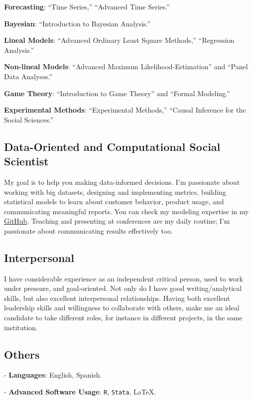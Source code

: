\documentclass[letterpaper]{article}
\renewenvironment{itemize}{
  \begin{list}{}{
    \setlength{\leftmargin}{1.5em}
  }
}{
  \end{list}
}
\begin{document}
\begin{itemize}
	\item[-] {\bf Forecasting}: ``Time Series,'' ``Advanced Time Series.''
	\item[-] {\bf Bayesian}: ``Introduction to Bayesian Analysis.'' 
	\item[-] {\bf Lineal Models}: ``Advanced Ordinary Least Square Methods,'' ``Regression Analysis.''
	\item[-] {\bf Non-lineal Models}: ``Advanced Maximum Likelihood-Estimation'' and ``Panel Data Analyses.''
	\item[-] {\bf Game Theory}: ``Introduction to Game Theory'' and ``Formal Modeling.''
	\item[-] {\bf Experimental Methods}: ``Experimental Methods,'' ``Causal Inference for the Social Sciences.''
\end{itemize}


\subsection*{Data-Oriented and Computational Social Scientist}
My goal is to help you making data-informed decisions. 
I'm passionate about working with big datasets, designing and implementing metrics, building statistical models to learn about customer behavior, product usage, and communicating meaningful reports. You can check my modeling expertise in my \href{https://github.com/hbahamonde}{GitHub}. Teaching and presenting at conferences are my daily routine; I'm passionate about communicating results effectively too.







\subsection*{Interpersonal}
I have considerable experience as an independent critical person, used to work under pressure, and goal-oriented. Not only do I have good writing/analytical skills, but also excellent interpersonal relationships. Having both excellent leadership skills and willingness to collaborate with others, make me an ideal candidate to take different roles, for instance in different projects, in the same institution. 





\subsection*{Others}
\begin{itemize}
	\item- {\bf Languages}: English, Spanish.
	\item- {\bf Advanced Software Usage}: \texttt{R}, \texttt{Stata}, \LaTeX.
\end{itemize}
\end{document}
